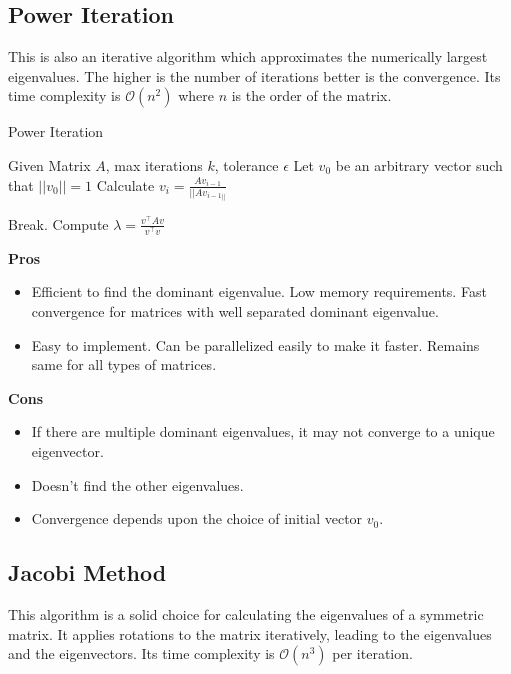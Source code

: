 \documentclass{article}
\begin{document}
\subsection{Power Iteration}
This is also an iterative algorithm which approximates the numerically largest eigenvalues. The higher is the number of iterations better is the convergence. Its time complexity is $\mathcal{O}(n^2)$ where $n$ is the order of the matrix.
\begin{algorithm}[H]
\caption{Power Iteration}
\begin{algorithmic}[1]
    \Statex Given Matrix $A$, max iterations $k$, tolerance $\epsilon$
    \State Let $v_0$ be an arbitrary vector such that $||v_0|| = 1$
        \State Calculate $\displaystyle v_i = \frac{Av_{i-1}}{||Av_{i-1||}}$

            \State Break.
        \EndIf
    \EndFor
    \State Compute $\displaystyle \lambda = \frac{v^{\top} A v}{v^{\top} v}$

\end{algorithmic}
\end{algorithm}

\begin{multicols}{2}
\begin{center}\textbf{Pros}\end{center}
\begin{itemize}
    \item Efficient to find the dominant eigenvalue. Low memory requirements. Fast convergence for matrices with well separated dominant eigenvalue.
    \item Easy to implement. Can be parallelized easily to make it faster. Remains same for all types of matrices.
\end{itemize}
\columnbreak
\begin{center}\textbf{Cons}\end{center}
\begin{itemize}
    \item If there are multiple dominant eigenvalues, it may not converge to a unique eigenvector.
    \item Doesn't find the other eigenvalues.
    \item Convergence depends upon the choice of initial vector $v_0$.
\end{itemize}
\end{multicols}

\subsection{Jacobi Method}
This algorithm is a solid choice for calculating the eigenvalues of a symmetric matrix. It applies rotations to the matrix iteratively, leading to the eigenvalues and the eigenvectors. Its time complexity is $\mathcal{O}(n^3)$ per iteration.
\end{document}
